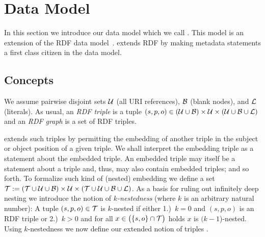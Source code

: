 \section{Data Model} \label{Section:DataModel}

In this section we introduce
	our data model which we call {\RDFplus}. This model is an extension of the RDF data model~\cite{Klyne04:RDFconcepts}. {\RDFplus} extends RDF by making metadata statements a first class citizen in the data model.



\subsection{Concepts}

We assume
pairwise disjoint sets $\mathcal{U}$ (all URI references), $\mathcal{B}$ (blank nodes), and $\mathcal{L}$ (literals).
	As usual, an \emph{RDF triple} is a tuple $(s,p,o) \in (\mathcal{U} \cup \mathcal{B}) \times \mathcal{U} \times (\mathcal{U} \cup \mathcal{B} \cup \mathcal{L})$ and an \emph{RDF graph} is a set of RDF triples.

{\RDFplus} extends such triples by permitting the embedding of another triple in the subject or object position of a given triple. We shall interpret the embedding triple as a statement about the embedded triple. An embedded triple may itself be a statement about a triple and, thus, may also contain embedded triples; and so forth.
%
	To formalize
such kind of (nested) embedding we
	define
a set $\mathcal{T} := (\mathcal{T} \cup \mathcal{U} \cup \mathcal{B}) \times \mathcal{U} \times (\mathcal{T} \cup \mathcal{U} \cup \mathcal{B} \cup \mathcal{L})$.
%
	As a basis for ruling
out infinitely deep nesting we introduce the notion of \emph{$k$-nestedness} (where $k$
	is an arbitrary
natural number): A tuple $(s,p,o) \in \mathcal{T}$ is $k$-nested if either 1.)~$k=0$ and
	$(s,p,o)$ is an RDF triple
or 2.)~$k>0$ and for all $x \in \bigl( \lbrace s,o \rbrace \cap \mathcal{T} \bigr)$ holds $x$ is $(k\!-\!1$)-nested. Using $k$-nestedness we now define our extended notion of triples%
	.

